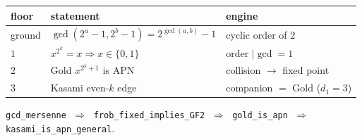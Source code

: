 \documentclass[11pt]{article}
\begin{document}
\begin{center}
\renewcommand{\arraystretch}{1.6}
\begin{tabular}{l l l}
\textbf{floor} & \textbf{statement} & \textbf{engine} \\
\hline
ground & $\gcd(2^a{-}1,2^b{-}1)=2^{\gcd(a,b)}{-}1$ & cyclic order of $2$ \\
$1$ & $x^{2^k}{=}x \Rightarrow x\in\{0,1\}$ & order $\mid \gcd = 1$ \\
$2$ & Gold $x^{2^k+1}$ is APN & collision $\to$ fixed point \\
$3$ & Kasami even-$k$ edge & companion $= $ Gold ($d_1=3$) \\
\end{tabular}
\end{center}

\bigskip
\noindent
\colorbox{leanbg}{\parbox{\dimexpr\linewidth-2\fboxsep}{\centering
\texttt{gcd\_mersenne} $\;\Rightarrow\;$ \texttt{frob\_fixed\_implies\_GF2}
$\;\Rightarrow\;$ \texttt{gold\_is\_apn} $\;\Rightarrow\;$ \texttt{kasami\_is\_apn\_general}.}}
\end{document}
